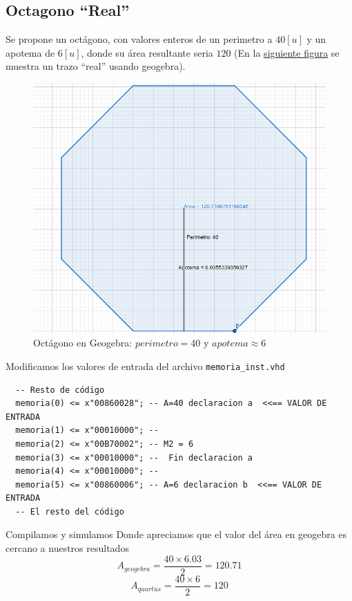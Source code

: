 \documentclass{IEEEtran}
\begin{document}
\subsection{Octagono ``Real''}
\label{sec:org78e62b4}
Se propone un octágono, con valores enteros de un perimetro a \(40[u]\) y un apotema de \(6[u]\),  donde su área resultante seria \(120\) (En la \hyperref[fig:geo51x7]{siguiente figura} se muestra un trazo ``real'' usando geogebra).
\begin{figure}[htbp]
\centering
\includegraphics[width=.9\linewidth]{./img/geo40x6.png}
\caption{\label{fig:geo51x7}Octágono en Geogebra: \(perimetro = 40\) y \(apotema \approx 6\)}
\end{figure}
Modificamos los valores de entrada del archivo \texttt{memoria\_inst.vhd}
\begin{verbatim}
  -- Resto de código
  memoria(0) <= x"00860028"; -- A=40 declaracion a  <<== VALOR DE ENTRADA
  memoria(1) <= x"00010000"; --
  memoria(2) <= x"00B70002"; -- M2 = 6
  memoria(3) <= x"00010000"; --  Fin declaracion a
  memoria(4) <= x"00010000"; --
  memoria(5) <= x"00860006"; -- A=6 declaracion b  <<== VALOR DE ENTRADA
  -- El resto del código
\end{verbatim}
Compilamos y simulamos
Donde apreciamos que el valor del área en geogebra es cercano a nuestros resultados
\[ A_{geogebra} = \frac{40 \times 6.03}{2} = 120.71 \]
\[ A_{quartus} = \frac{40 \times 6}{2} = 120 \]
\end{document}

